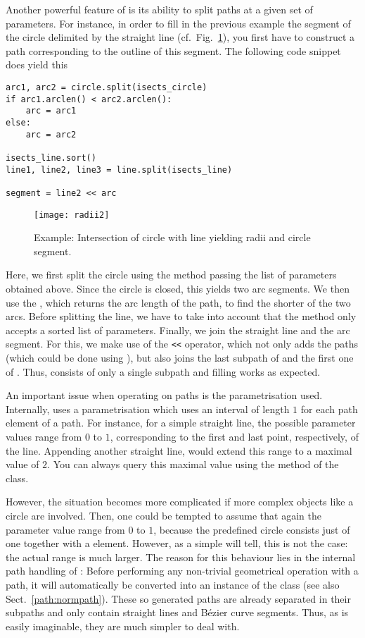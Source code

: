 Another powerful feature of \PyX{} is its ability to split paths at a
given set of parameters. For instance, in order to fill in the
previous example the segment of the circle delimited by the straight
line (cf.\ Fig.~\ref{fig:radii2}), you first have to construct a path
corresponding to the outline of this segment. The following code
snippet does yield this 
\begin{verbatim}
arc1, arc2 = circle.split(isects_circle)
if arc1.arclen() < arc2.arclen():
    arc = arc1
else:
    arc = arc2

isects_line.sort()
line1, line2, line3 = line.split(isects_line)

segment = line2 << arc
\end{verbatim}
\begin{figure}
\centerline{\texttt{[image: radii2]}}
\caption{Example: Intersection of circle with line yielding radii and
  circle segment.}
\label{fig:radii2}
\end{figure}
Here, we first split the circle using the  method passing
the list of parameters obtained above. Since the circle is closed,
this yields two arc segments. We then use the , which
returns the arc length of the path, to find the shorter of the two
arcs. Before splitting the line, we have to take into account that
the  method only accepts a sorted list of parameters.
Finally, we join the straight line and the arc segment. For
this, we make use of the \verb|<<| operator, which not only adds
the paths (which could be done using ), but also
joins the last subpath of  and the first one of
. Thus,  consists of only a single subpath
and filling works as expected.

An important issue when operating on paths is the parametrisation
used. Internally, \PyX{} uses a parametrisation which uses an interval
of length $1$ for each path element of a path. For instance, for a
simple straight line, the possible parameter values range from $0$ to
$1$, corresponding to the first and last point, respectively, of the
line. Appending another straight line, would extend this range to a
maximal value of $2$. You can always query this maximal value using
the  method of the  class.  

However, the situation becomes more complicated if more complex
objects like a circle are involved. Then, one could be tempted to
assume that again the parameter value range from $0$ to $1$, because
the predefined circle consists just of one  together with a
 element. However, as a simple  will tell, this is not the case: the actual range is
much larger. The reason for this behaviour lies in the internal path
handling of \PyX: Before performing any non-trivial geometrical
operation with a path, it will automatically be converted into an
instance of the  class (see also
Sect.~\ref{path:normpath}). These so generated paths are already
separated in their subpaths and only contain straight lines and
B\'ezier curve segments. Thus, as is easily imaginable, they are much
simpler to deal with.

